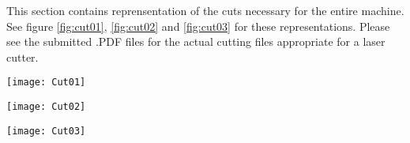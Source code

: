 \label{appendix:cuts}
This section contains reprensentation of the cuts necessary for the entire machine. See figure \ref{fig:cut01}, \ref{fig:cut02} and \ref{fig:cut03} for these representations. Please see the submitted .PDF files for the actual cutting files appropriate for a laser cutter. 
\begin{figure*}
	\texttt{[image: Cut01]}
	\caption{This cut contains brackets and bodywork for the entire machine.}
	\label{fig:cut01}
\end{figure*}
\begin{figure*}
	\texttt{[image: Cut02]}
	\caption{This cut contains the cuts neccessary for the ball-return slide}
	\label{fig:cut02}
\end{figure*}
\begin{figure*}
	\texttt{[image: Cut03]}
	\caption{This cut represents the holes neccesary for the playfield. Essentially when cut, the whole board becomes the playfield.}
	\label{fig:cut03}
\end{figure*}
